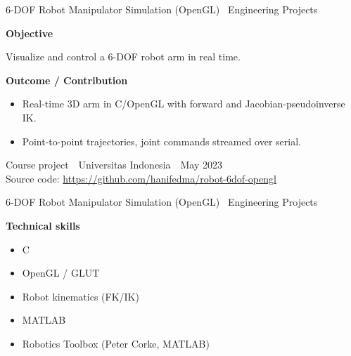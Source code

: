 \documentclass[aspectratio=169,11pt]{beamer}
\newcommand{\blocklabel}[1]{\par{\color{textmain}\bfseries\large #1}\par\smallskip}
\newcommand{\linkline}[2]{{\footnotesize #1: \url{#2}}}
\newcommand{\sectsuffix}[1]{\,{\normalfont\mdseries\,\textemdash\ #1}}
\begin{document}
\begin{frame}{6-DOF Robot Manipulator Simulation (OpenGL)\sectsuffix{Engineering Projects}}
  \blocklabel{Objective}
  Visualize and control a 6-DOF robot arm in real time.
  \medskip
  \blocklabel{Outcome / Contribution}
  \begin{itemize}\small\setlength\itemsep{6pt}
    \item Real-time 3D arm in C/OpenGL with forward and Jacobian-pseudoinverse IK.
    \item Point-to-point trajectories, joint commands streamed over serial.
  \end{itemize}
  \vfill
  {\footnotesize\color{textsec} Course project \,\textbullet\, Universitas Indonesia \,\textbullet\, May 2023}\\[3pt]
  \linkline{Source code}{https://github.com/hanifedma/robot-6dof-opengl}
\end{frame}

\begin{frame}{6-DOF Robot Manipulator Simulation (OpenGL)\sectsuffix{Engineering Projects}}
  \blocklabel{Technical skills}
  \begin{itemize}\setlength\itemsep{6pt}
    \item C
    \item OpenGL / GLUT
    \item Robot kinematics (FK/IK)
    \item MATLAB
    \item Robotics Toolbox (Peter Corke, MATLAB)
  \end{itemize}
\end{frame}
\end{document}
